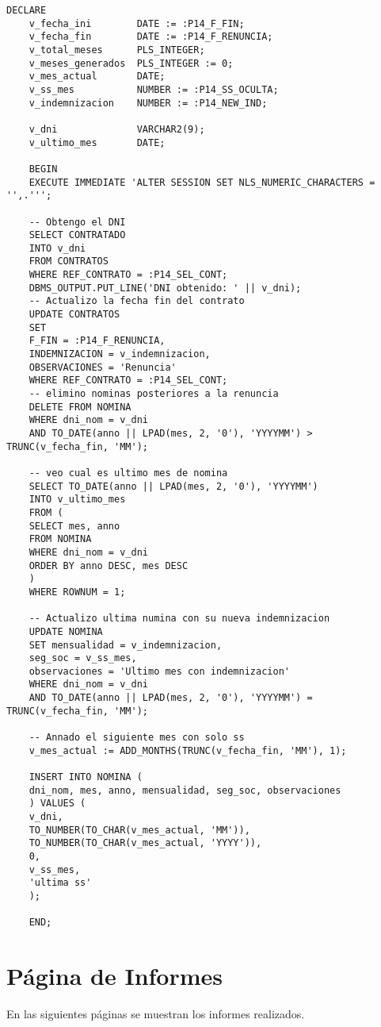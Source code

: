 \begin{lstlisting}[language=PLSQL, caption={Genera las nuevas nóminas tras la renuncia}]
	DECLARE
	v_fecha_ini        DATE := :P14_F_FIN; 
	v_fecha_fin        DATE := :P14_F_RENUNCIA;
	v_total_meses      PLS_INTEGER;
	v_meses_generados  PLS_INTEGER := 0;
	v_mes_actual       DATE;
	v_ss_mes           NUMBER := :P14_SS_OCULTA;
	v_indemnizacion    NUMBER := :P14_NEW_IND;
	
	v_dni              VARCHAR2(9);
	v_ultimo_mes       DATE;
	
	BEGIN
	EXECUTE IMMEDIATE 'ALTER SESSION SET NLS_NUMERIC_CHARACTERS = '',.''';
	
	-- Obtengo el DNI
	SELECT CONTRATADO
	INTO v_dni
	FROM CONTRATOS
	WHERE REF_CONTRATO = :P14_SEL_CONT;
	DBMS_OUTPUT.PUT_LINE('DNI obtenido: ' || v_dni);
	-- Actualizo la fecha fin del contrato
	UPDATE CONTRATOS
	SET 
	F_FIN = :P14_F_RENUNCIA,
	INDEMNIZACION = v_indemnizacion,
	OBSERVACIONES = 'Renuncia'
	WHERE REF_CONTRATO = :P14_SEL_CONT;
	-- elimino nominas posteriores a la renuncia
	DELETE FROM NOMINA
	WHERE dni_nom = v_dni
	AND TO_DATE(anno || LPAD(mes, 2, '0'), 'YYYYMM') > TRUNC(v_fecha_fin, 'MM');
	
	-- veo cual es ultimo mes de nomina
	SELECT TO_DATE(anno || LPAD(mes, 2, '0'), 'YYYYMM')
	INTO v_ultimo_mes
	FROM (
	SELECT mes, anno
	FROM NOMINA
	WHERE dni_nom = v_dni
	ORDER BY anno DESC, mes DESC
	)
	WHERE ROWNUM = 1;
	
	-- Actualizo ultima numina con su nueva indemnizacion
	UPDATE NOMINA
	SET mensualidad = v_indemnizacion,
	seg_soc = v_ss_mes,
	observaciones = 'Ultimo mes con indemnizacion'
	WHERE dni_nom = v_dni
	AND TO_DATE(anno || LPAD(mes, 2, '0'), 'YYYYMM') = TRUNC(v_fecha_fin, 'MM');
	
	-- Annado el siguiente mes con solo ss
	v_mes_actual := ADD_MONTHS(TRUNC(v_fecha_fin, 'MM'), 1);
	
	INSERT INTO NOMINA (
	dni_nom, mes, anno, mensualidad, seg_soc, observaciones
	) VALUES (
	v_dni,
	TO_NUMBER(TO_CHAR(v_mes_actual, 'MM')),
	TO_NUMBER(TO_CHAR(v_mes_actual, 'YYYY')),
	0,
	v_ss_mes,
	'ultima ss'
	);
	
	END;
\end{lstlisting}

\section{Página de Informes}
En las siguientes páginas se muestran los informes realizados.
